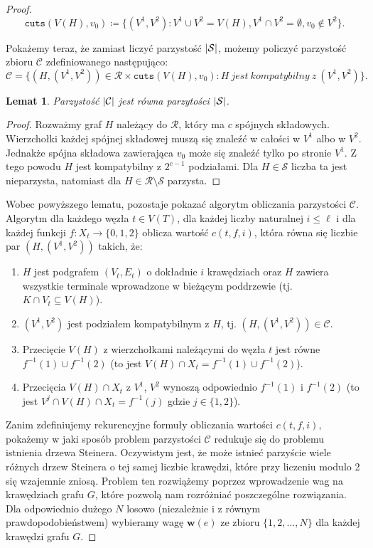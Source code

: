 \documentclass[12pt, oneside]{report}
\newtheorem{lemma}{Lemat}
\begin{document}
\begin{proof}
$$\texttt{cuts} (V(H), v_0) \coloneqq \{(V^1, V^2): V^1 \cup V^2 = V(H), V^1 \cap V^2 = \emptyset, v_0 \notin V^2\}.$$

Pokażemy teraz, że zamiast liczyć parzystość $\abs{\mathcal{S}}$, możemy policzyć parzystość zbioru $\mathcal{C}$ zdefiniowanego następująco:
$$\mathcal{C} = \{(H, (V^1, V^2)) \in \mathcal{R} \times \texttt{cuts}(V(H), v_0) : H\ jest\ kompatybilny\ z\ (V^1, V^2)\}.$$

\begin{lemma}
Parzystość $\abs{\mathcal{C}}$ jest równa parzytości $\abs{\mathcal{S}}$.
\end{lemma}

\begin{proof}
Rozważmy graf $H$ należący do $\mathcal{R}$, który ma $c$ spójnych składowych. Wierzchołki każdej spójnej składowej muszą się znaleźć w całości w $V^1$ albo w $V^2$. Jednakże spójna składowa zawierająca $v_0$ może się znaleźć tylko po stronie $V^1$. Z tego powodu $H$ jest kompatybilny z $2^{c-1}$ podziałami. Dla $H \in \mathcal{S}$ liczba ta jest nieparzysta, natomiast dla $H \in \mathcal{R} \setminus \mathcal{S}$ parzysta. 
\end{proof}

Wobec powyższego lematu, pozostaje pokazać algorytm obliczania parzystości $\mathcal{C}$. Algorytm dla każdego węzła $t \in V(T)$, dla każdej liczby naturalnej $i \leq \ell$ i dla każdej funkcji $f: X_t \to \{0,1,2\}$ oblicza wartość $c(t, f, i)$, która równa się liczbie par $(H, (V^1, V^2))$ takich, że:

\begin{enumerate}[label=(\roman*)]
\item \label{steiner_i}$H$ jest podgrafem $(V_t, E_t)$ o dokładnie $i$ krawędziach oraz $H$ zawiera wszystkie terminale wprowadzone w bieżącym poddrzewie (tj. $K \cap V_t \subseteq V(H)$).
\item $(V^1, V^2)$ jest podziałem kompatybilnym z $H$, tj. $(H, (V^1, V^2)) \in \mathcal{C}$.
\item Przecięcie $V(H)$ z wierzchołkami należącymi do węzła $t$ jest równe $f^{-1}(1) \cup f^{-1}(2)$ (to jest $V(H) \cap X_t = f^{-1}(1) \cup f^{-1}(2)$).
\item \label{steiner_iv}Przecięcia $V(H) \cap X_t$ z $V^1$, $V^2$ wynoszą odpowiednio $f^{-1}(1)$ i $f^{-1}(2)$ (to jest $V^j \cap V(H) \cap X_t = f^{-1}(j)$ gdzie $j \in \{1,2\}$).
\end{enumerate} 

Zanim zdefiniujemy rekurencyjne formuły obliczania wartości $c(t, f, i)$, pokażemy w jaki sposób problem parzystości $\mathcal{C}$ redukuje się do problemu istnienia drzewa Steinera. Oczywistym jest, że może istnieć parzyście wiele różnych drzew Steinera o tej samej liczbie krawędzi, które przy liczeniu modulo 2 się wzajemnie zniosą. Problem ten rozwiążemy poprzez wprowadzenie wag na krawędziach grafu $G$, które pozwolą nam rozróżniać poszczególne rozwiązania. 
Dla odpowiednio dużego $N$ losowo (niezależnie i z równym prawdopodobieństwem) wybieramy wagę $\mathbf{w}(e)$ ze zbioru $\{1,2,\dots,N\}$ dla każdej krawędzi grafu $G$. 


\end{proof}
\end{document}
